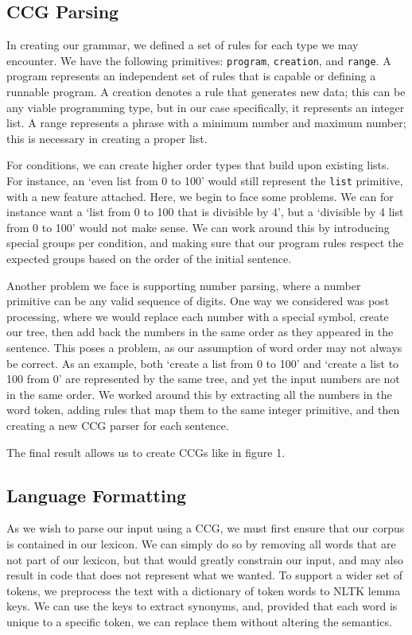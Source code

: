 \documentclass[11pt,letterpaper]{article}
\begin{document}
\subsection{CCG Parsing}

In creating our grammar, we defined a set of rules for each type we may encounter. 
We have the following primitives: {\small\verb|program|}, {\small\verb|creation|}, and {\small\verb|range|}.
A program represents an independent set of rules that is capable or defining a runnable program.
A creation denotes a rule that generates new data;
this can be any viable programming type, but in our case specifically, it represents an integer list.
A range represents a phrase with a minimum number and maximum number;
this is necessary in creating a proper list.

For conditions, we can create higher order types that build upon existing lists.
For instance, an `even list from 0 to 100' would still represent the {\small\verb|list|} primitive, with a new feature attached.
Here, we begin to face some problems.
We can for instance want a `list from 0 to 100 that is divisible by 4', but a `divisible by 4 list from 0 to 100' would not make sense.
We can work around this by introducing special groups per condition, and making sure that our program rules respect the expected groups based on the order of the initial sentence.

Another problem we face is supporting number parsing, where a number primitive can be any valid sequence of digits. 
One way we considered was post processing, where we would replace each number with a special symbol, create our tree, then add back the numbers in the same order as they appeared in the sentence.
This poses a problem, as our assumption of word order may not always be correct. As an example, both `create a list from 0 to 100' and `create a list to 100 from 0' are represented by the same tree, and yet the input numbers are not in the same order.
We worked around this by extracting all the numbers in the word token, adding rules that map them to the same integer primitive, and then creating a new CCG parser for each sentence.

The final result allows us to create CCGs like in figure 1.

\subsection{Language Formatting}

As we wish to parse our input using a CCG, we must first ensure that our corpus is contained in our lexicon.
We can simply do so by removing all words that are not part of our lexicon, but that would greatly constrain our input, and may also result in code that does not represent what we wanted.
To support a wider set of tokens, we preprocess the text with a dictionary of token words to NLTK lemma keys.
We can use the keys to extract synonyms, and, provided that each word is unique to a specific token, we can replace them without altering the semantics.
\end{document}
